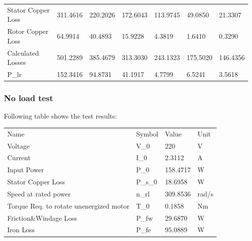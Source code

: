 \begin{table}[hbtp!]
\begin{tabular}{
    >{\columncolor[HTML]{9B9B9B}}l llllll}
    Stator Copper Loss                  & 311.4616                      & 220.2026                      & 172.6043                      & 113.9745                     & 49.0850                      & 21.3307                      \\
    Rotor Copper Loss                   & 64.9914                       & 40.4893                       & 15.9228                       & 4.3819                       & 1.6410                       & 0.3290                       \\
    Calculated Losses                   & 501.2289                      & 385.4679                      & 313.3030                      & 243.1323                     & 175.5020                     & 146.4356                     \\
    P\_lr                               & 152.3416                      & 94.8731                       & 41.1917                       & 4.7799                       & 6.5241                       & 3.5618                      
\end{tabular}
\end{table}

\subsubsection{No load test}
Following table shows the test results:
\begin{table}[hbtp!]
\begin{tabular}{llll}
    \rowcolor[HTML]{656565} 
    Name                                                              & Symbol  & Value    & Unit  \\
    \cellcolor[HTML]{9B9B9B}Voltage                                   & V\_0    & 220      & V     \\
    \rowcolor[HTML]{F2F2F2} 
    \cellcolor[HTML]{9B9B9B}Current                                   & I\_0    & 2.3112   & A     \\
    \cellcolor[HTML]{9B9B9B}Input   Power                             & P\_0    & 158.4717 & W     \\
    \rowcolor[HTML]{F2F2F2} 
    \cellcolor[HTML]{9B9B9B}Stator   Copper Loss                      & P\_s\_0 & 18.6958  & W     \\
    \cellcolor[HTML]{9B9B9B}Speed at   rated power                    & n\_rl   & 309.8536 & rad/s \\
    \rowcolor[HTML]{F2F2F2} 
    \cellcolor[HTML]{9B9B9B}Torque   Req. to rotate unenergized motor & T\_0    & 0.1858   & Nm    \\
    \cellcolor[HTML]{9B9B9B}Friction\&Windage   Loss                  & P\_fw   & 29.6870  & W     \\
    \rowcolor[HTML]{F2F2F2} 
    \cellcolor[HTML]{9B9B9B}Iron Loss                                 & P\_fe   & 95.0889 & W    
\end{tabular}
\end{table}

